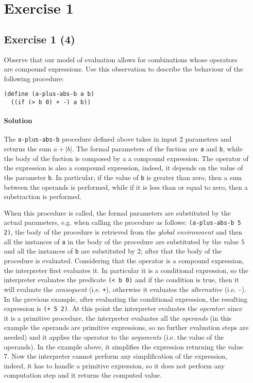 \section*{Exercise 1}

\subsection*{Exercise 1 (4)}
Observe that our model of evaluation allows for combinations whose operators are compound expressions. Use this observation to 
describe the behaviour of the following procedure:

\begin{lstlisting}
(define (a-plus-abs-b a b) 
  ((if (> b 0) + -) a b))
\end{lstlisting}

\paragraph{Solution}
The \texttt{a-plus-abs-b} procedure defined above takes in input 2 parameters and returns the sum $ a + |b| $. 
The formal parameters of the fuction are \texttt{a} and \texttt{b}, while the body of the fuction is composed by a 
a compound expression. The operator of the expression is also a compound expression, indeed, it depends on the value of the
parameter \texttt{b}. In particular, if the value of \texttt{b} is greater than zero, then a sum between the operands is performed,
while if it is less than or equal to zero, then a substraction is performed.

When this procedure is called, the formal parameters are substituted by the actual parameters, e.g. when calling the procedure as
follows: \texttt{(a-plus-abs-b 5 2)}, the body of the procedure is retrieved from the \textit{global environment} and then 
all the instances of \texttt{a} in the body of the procedure are substituted by the value
$ 5 $ and all the instances of \texttt{b} are substituted by $ 2 $; after that the body of the procedure is evaluated.
Considering that the operator is a compound expression, the interpreter first evaluates it. 
In particular it is a conditional  expression, so the interpreter evaluates the predicate \texttt{(< b 0)} 
and if the condition is true, then it will evaluate the \textit{consequent} (i.e. \texttt{+}), otherwise it evaluates the 
\textit{alternative} (i.e. \texttt{-}).
In the previous example, after evaluating the conditional expression, the resulting expression is \texttt{(+ 5 2)}.
At this point the interpreter evaluates the \textit{operator}: since it is a primitive procedure, the interpreter evaluates all the 
\textit{operands} (in this example the operands are primitive expressions, so no further evaluation steps are needed) and it
applies the operator to the \textit{arguments} (i.e. the value of the operands).
In the example above, it simplifies the expression returning the value $7$.
Now the interpreter cannot perform any simplification of the expression, indeed, it has to handle a primitive expression, so 
it does not perform any computation step and it returns the computed value.


